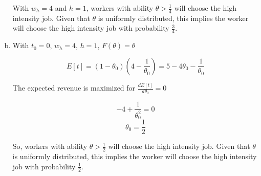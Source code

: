 \documentclass{article}
\begin{document}
\begin{enumerate}[(a)]
	With $w_h = 4$ and $h = 1$, workers with ability $\theta > \frac{1}{4}$ will choose the high intensity job. Given that $\theta$ is uniformly distributed, this implies the worker will choose the high intensity job with probability $\frac{3}{4}$.

	\item 

	With $t_0 = 0$, $w_h = 4$, $h=1$, $F(\theta) = \theta$

	\begin{equation*}
	E[t] = (1 - \theta_0) (4 - \frac{1}{\theta_0}) = 5 - 4\theta_0 - \frac{1}{\theta_0}
	\end{equation*}

	The expected revenue is maximized for $\frac{d E[t]}{d \theta_0} = 0$

	\begin{equation*}
	-4 + \frac{1}{\theta_0^2} = 0
	\end{equation*}
	\begin{equation*}
	\theta_0 = \frac{1}{2}
	\end{equation*}

	So, workers with ability $\theta > \frac{1}{2}$ will choose the high intensity job. Given that $\theta$ is uniformly distributed, this implies the worker will choose the high intensity job with probability $\frac{1}{2}$.

\end{enumerate}
\end{document}
